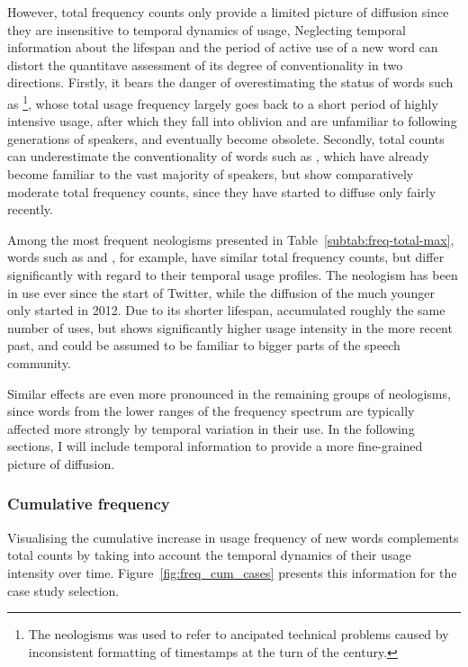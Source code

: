 \documentclass[
  a4paper,
  abstract=on,
  captions=tableabove
  ]{scrartcl}
\begin{document}
      However, total frequency counts only provide a limited picture of diffusion since they are insensitive to temporal dynamics of usage, Neglecting temporal information about the lifespan and the period of active use of a new word can distort the quantitave assessment of its degree of conventionality in two directions. Firstly, it bears the danger of overestimating the status of words such as \footnote{The neologisms  was used to refer to ancipated technical problems caused by inconsistent formatting of timestamps at the turn of the century.}, whose total usage frequency largely goes back to a short period of highly intensive usage, after which they fall into oblivion and are unfamiliar to following generations of speakers, and eventually become obsolete. Secondly, total counts can underestimate the conventionality of words such as , which have already become familiar to the vast majority of speakers, but show comparatively moderate total frequency counts, since they have started to diffuse only fairly recently.

      Among the most frequent neologisms presented in Table~\ref{subtab:freq-total-max}, words such as  and , for example, have similar total frequency counts, but differ significantly with regard to their temporal usage profiles. The neologism  has been in use ever since the start of Twitter, while the diffusion of the much younger  only started in 2012. Due to its shorter lifespan,  accumulated roughly the same number of uses, but shows significantly higher usage intensity in the more recent past, and could be assumed to be familiar to bigger parts of the speech community.

      Similar effects are even more pronounced in the remaining groups of neologisms, since words from the lower ranges of the frequency spectrum are typically affected more strongly by temporal variation in their use. In the following sections, I will include temporal information to provide a more fine-grained picture of diffusion.


    \subsubsection{Cumulative frequency}

      Visualising the cumulative increase in usage frequency of new words complements total counts by taking into account the temporal dynamics of their usage intensity over time. Figure~\ref{fig:freq_cum_cases} presents this information for the case study selection.
\end{document}
